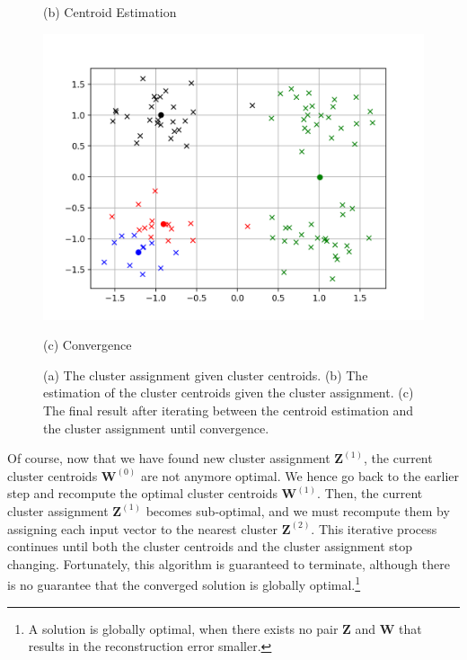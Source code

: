 \documentclass{report}
\newcommand{\matr}[1]{\mathbf{#1}}
\newcommand{\mW}[0]{\matr{W}}
\newcommand{\mZ}[0]{\matr{Z}}
\begin{document}
\begin{figure}[t]
\begin{minipage}{0.32\textwidth}
        (b) Centroid Estimation
    \end{minipage}
    \hfill
    \begin{minipage}{0.32\textwidth}
        \centering
        \includegraphics[width=\columnwidth]{./figures/kmeans_local.png}

        (c) Convergence
    \end{minipage}
    \caption{
        \label{fig:kmeans1}
        (a) The cluster assignment given cluster centroids.  (b) The estimation
        of the cluster centroids given the cluster assignment.
        (c) The final result after
        iterating between the centroid estimation and the cluster assignment
        until convergence. 
    }
\end{figure}

Of course, now that we have found new cluster assignment $\mZ^{(1)}$, the
current cluster centroids $\mW^{(0)}$ are not anymore optimal. We hence go back
to the earlier step and recompute the optimal cluster centroids $\mW^{(1)}$.
Then, the current cluster assignment $\mZ^{(1)}$ becomes sub-optimal, and we
must recompute them by assigning each input vector to the nearest cluster
$\mZ^{(2)}$. This iterative process continues until both the cluster centroids
and the cluster assignment stop changing. Fortunately, this algorithm is
guaranteed to terminate, although there is no guarantee that the converged
solution is globally optimal.\footnote{
    A solution is globally optimal, when there exists no pair $\mZ$ and $\mW$
    that results in the reconstruction error smaller.
}
\end{document}
